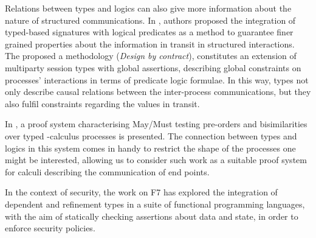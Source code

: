 Relations between types and logics can also give more information
about the nature of structured communications. In
\cite{Bocchi2010A-theory-of-des}, authors proposed the integration of
typed-based signatures with logical predicates as a method to
guarantee finer grained properties about the information in transit in
structured interactions. The proposed a methodology (\emph{Design by
  contract}), constitutes an extension of multiparty session types
\cite{DBLP:conf/popl/HondaYC08} with global assertions, describing
global constraints on processes' interactions in terms of predicate
logic formulae. In this way, types not only describe causal relations
between the inter-process communications, but they also fulfil
constraints regarding the values in transit.

In \cite{Berger2008Completeness-an}, a proof system characterising
May/Must testing pre-orders and bisimilarities over typed
\mipi-calculus processes is presented. The connection between types
and logics in this system comes in handy to restrict the shape of the
processes one might be interested, allowing us to consider such work
as a suitable proof system for calculi describing the communication of
end points.

In the context of security, the work on F7 \cite{gordon2009principles} has explored the
integration of dependent and refinement types in a suite of functional
programming languages, with the aim of statically checking assertions
about data and state, in order to enforce security policies.








